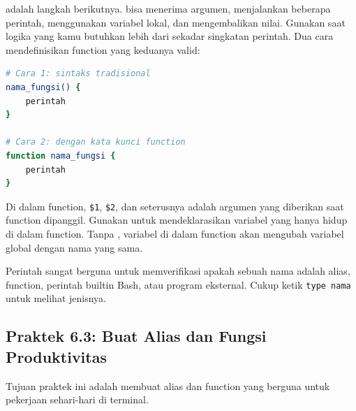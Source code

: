  adalah langkah berikutnya.  bisa menerima argumen,
menjalankan beberapa perintah, menggunakan variabel lokal, dan mengembalikan
nilai. Gunakan  saat logika yang kamu butuhkan lebih dari sekadar
singkatan perintah. Dua cara mendefinisikan function yang keduanya valid:

\begin{lstlisting}[language=bash, caption={Dua cara mendefinisikan shell function}]
# Cara 1: sintaks tradisional
nama_fungsi() {
    perintah
}

# Cara 2: dengan kata kunci function
function nama_fungsi {
    perintah
}
\end{lstlisting}

Di dalam function, \texttt{\$1}, \texttt{\$2}, dan seterusnya adalah
argumen yang diberikan saat function dipanggil. Gunakan  untuk
mendeklarasikan variabel yang hanya hidup di dalam function. Tanpa ,
variabel di dalam function akan mengubah variabel global dengan nama yang sama.

Perintah  sangat berguna untuk memverifikasi apakah sebuah nama
adalah alias, function, perintah builtin Bash, atau program eksternal. Cukup
ketik \texttt{type nama} untuk melihat jenisnya.

\subsection*{Praktek 6.3: Buat Alias dan Fungsi Produktivitas}

Tujuan praktek ini adalah membuat alias dan function yang berguna untuk
pekerjaan sehari-hari di terminal.

